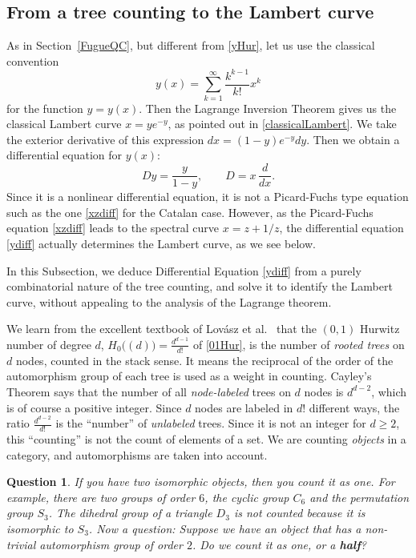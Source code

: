 \documentclass{amsart}
\newtheorem{quest}[thm]{Question}
\theoremstyle{definition}
\numberwithin{equation}{section}
\numberwithin{figure}{section}
\newcommand{\be}{\begin{equation}}
\newcommand{\ee}{\end{equation}}
\begin{document}
\subsection{From a tree counting to  the Lambert curve}
\label{Coda}



As in Section~\ref{FugueQC}, but different from \eqref{yHur}, let us use
the classical convention 
\be
\label{ynew}
y(x)=\sum_{k=1}^\infty \frac{k^{k-1}}{k!}x^k
\ee
for the function $y=y(x)$. Then the Lagrange Inversion Theorem
gives us the classical Lambert curve $x = y e^{-y}$, as pointed out in \eqref{classicalLambert}. We take the exterior derivative of this expression
$dx= (1-y)e^{-y}dy$. Then we obtain a differential equation 
for $y(x)$:
\be
\label{ydiff}
Dy = \frac{y}{1-y}, \qquad D = x\,\frac{d}{dx}.
\ee
Since it is a nonlinear differential equation, it is  not 
a Picard-Fuchs type equation such as the one \eqref{xzdiff}
for the Catalan case. However, as the Picard-Fuchs equation \eqref{xzdiff}
leads to the spectral curve $x=z+1/z$, 
the differential equation \eqref{ydiff} actually 
determines the Lambert curve, as we see below.





In this Subsection, we deduce Differential Equation \ref{ydiff}
from a purely combinatorial nature of the tree counting, and solve
it to identify the Lambert curve,
without 
appealing to the analysis of the Lagrange theorem. 

We learn from the excellent textbook of Lov\'asz et al.\ \cite{Ltext} that
the $(0,1)$ Hurwitz number of degree $d$,
$H_0\big((d)\big) =\frac{d^{d-1}}{d!}$ of \eqref{01Hur},
is the number of \emph{rooted trees} on $d$ nodes, 
counted in the stack sense. It means the reciprocal of the
order of the automorphism 
group of each tree is used as a weight in counting. 
Cayley's Theorem says that the number of all \emph{node-labeled} trees
on $d$ nodes is $d^{d-2}$, which is of course a positive integer. 
Since $d$ nodes are labeled in $d!$ different ways, 
the ratio $\frac{d^{d-2}}{d!}$ is the ``number'' of \emph{unlabeled}
trees. Since it is not an integer for $d\ge 2$, this ``counting'' is not
the count of elements of a set. We are counting \emph{objects}
in a category, and automorphisms are taken into account. 

\begin{quest}
If you have two isomorphic objects, then you count it as one. 
For example, there are two groups of order $6$, the cyclic group $C_6$
and the permutation group $S_3$. The dihedral group of a triangle $D_3$
is not counted because it is isomorphic to $S_3$.
Now a question: Suppose we have an object that 
has a non-trivial automorphism group of order $2$. 
Do we count it as one, or a \textbf{half}?
\end{quest}
\end{document}
